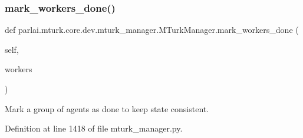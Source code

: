 \subsubsection{\texorpdfstring{mark\+\_\+workers\+\_\+done()}{mark\_workers\_done()}}
{\footnotesize\ttfamily def parlai.\+mturk.\+core.\+dev.\+mturk\+\_\+manager.\+M\+Turk\+Manager.\+mark\+\_\+workers\+\_\+done (\begin{DoxyParamCaption}\item[{}]{self,  }\item[{}]{workers }\end{DoxyParamCaption})}

\begin{DoxyVerb}Mark a group of agents as done to keep state consistent.
\end{DoxyVerb}
 

Definition at line 1418 of file mturk\+\_\+manager.\+py.


